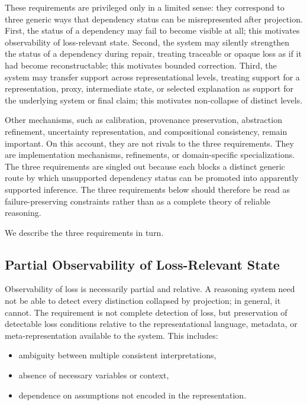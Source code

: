 \documentclass[11pt]{article}
\begin{document}
These requirements are privileged only in a limited sense: they correspond to three generic ways that dependency status can be misrepresented after projection. First, the status of a dependency may fail to become visible at all; this motivates observability of loss-relevant state. Second, the system may silently strengthen the status of a dependency during repair, treating traceable or opaque loss as if it had become reconstructable; this motivates bounded correction. Third, the system may transfer support across representational levels, treating support for a representation, proxy, intermediate state, or selected explanation as support for the underlying system or final claim; this motivates non-collapse of distinct levels.

Other mechanisms, such as calibration, provenance preservation, abstraction refinement, uncertainty representation, and compositional consistency, remain important. On this account, they are not rivals to the three requirements. They are implementation mechanisms, refinements, or domain-specific specializations. The three requirements are singled out because each blocks a distinct generic route by which unsupported dependency status can be promoted into apparently supported inference. The three requirements below should therefore be read as failure-preserving constraints rather than as a complete theory of reliable reasoning.

We describe the three requirements in turn.

\subsection{Partial Observability of Loss-Relevant State}

Observability of loss is necessarily partial and relative. A reasoning system need not be able to detect every distinction collapsed by projection; in general, it cannot. The requirement is not complete detection of loss, but preservation of detectable loss conditions relative to the representational language, metadata, or meta-representation available to the system. This includes:

\begin{itemize}[leftmargin=1.5em]
    \item ambiguity between multiple consistent interpretations,
    \item absence of necessary variables or context,
    \item dependence on assumptions not encoded in the representation.
\end{itemize}
\end{document}
